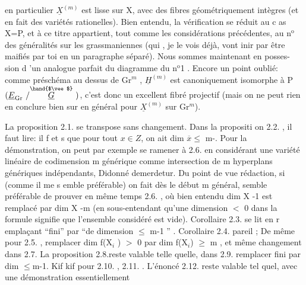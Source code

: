 
en particulier $\underline{X}^{(m)}$ est lisse sur X, avec des fibres géométriquement
intègres (et en fait des variétés rationelles). Bien entendu, la
vérification se réduit au c as X=P, et à ce titre appartient, tout
\margin{|}comme les considérations précédentes, au n$^{\text{o}}$ des généralités sur les
\margin{|}grassmaniennes (qui , je le vois déjà, vont inir par être maifiés
\margin{|}par toi en un paragraphe séparé). Nous sommes maintenant en posses-%
sion d 'un analogue parfait du diagramme du n$^{\text{o}}$1 . Encore un point
oublié: comme préschéma au dessus de Gr$^{m}$ , $\underline{H}^{(m)}$ est canoniquement
isomorphe à P$(\underline{E}_{\mathrm{Gr}}\ /\overset{\hand{$\vee$}}{\underline{G}}\ )$, c'est donc un excellent fibré projectif
(mais on ne peut rien en conclure bien sur en général pour $\underline{X}^{(m)}$ sur
Gr$^{m}$).

La proposition 2.1. se transpose sans changement. Dans la
propositi on 2.2. , il faut lire: il f et s que pour tout $x \in Z$, on
ait  dim $\overline{x} \leqslant$ m-. Pour la démonstration, on peut par exemple
se ramener à 2.6. en considérant une  variété linéaire de
codimension m générique comme intersection de m hyperplans génériques
indépendants, Didonné demerdetur. Du point de vue rédaction, si
(comme il me s emble préférable) on fait dès le début m général, 
semble préférable de prouver en même temps 2.6. , où bien entendu
dim X -1 est remplacé par dim X -m (en sous-entendant qu'une dimension
$<$ 0 dans la formule signifie que l'ensemble considéré est vide).
Corollaire 2.3. se lit en r emplaçant ``fini'' par ``de dimension $\leqslant$ 
m-1 '' . Corollaire 2.4. pareil ; De même pour 2.5. , remplacer
dim f(X$_{i}$ ) $>$ 0 par dim f(X$_{i}$) $\geqslant$ m , et même changement dans 2.7.
La proposition 2.8.reste valable telle quelle, dans 2.9. remplacer
fini par dim $\leqslant$m-1. Kif kif pour 2.10. , 2.11. . L'énoncé
2.12. reste valable tel quel, avec une démonstration essentiellement

